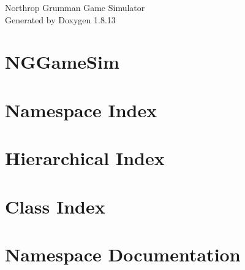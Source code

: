 \documentclass[twoside]{book}
\newcommand{\+}{\discretionary{\mbox{\scriptsize$\hookleftarrow$}}{}{}}
\newcommand{\clearemptydoublepage}{%
  \newpage{\pagestyle{empty}\cleardoublepage}%
}
\begin{document}
\hypersetup{pageanchor=false,
             bookmarksnumbered=true,
             pdfencoding=unicode
            }
\begin{titlepage}
\vspace*{7cm}
\begin{center}%
{\Large Northrop Grumman Game Simulator }\\
\vspace*{1cm}
{\large Generated by Doxygen 1.8.13}\\
\end{center}
\end{titlepage}
\clearemptydoublepage
{}
\tableofcontents
\clearemptydoublepage
{}
\hypersetup{pageanchor=true}

\chapter{N\+G\+Game\+Sim}
\label{md__c_1__users__booker__documents__school__stuff__n_g__n_g_game_sim__r_e_a_d_m_e}

\chapter{Namespace Index}

\chapter{Hierarchical Index}

\chapter{Class Index}

\chapter{Namespace Documentation}






\end{document}
